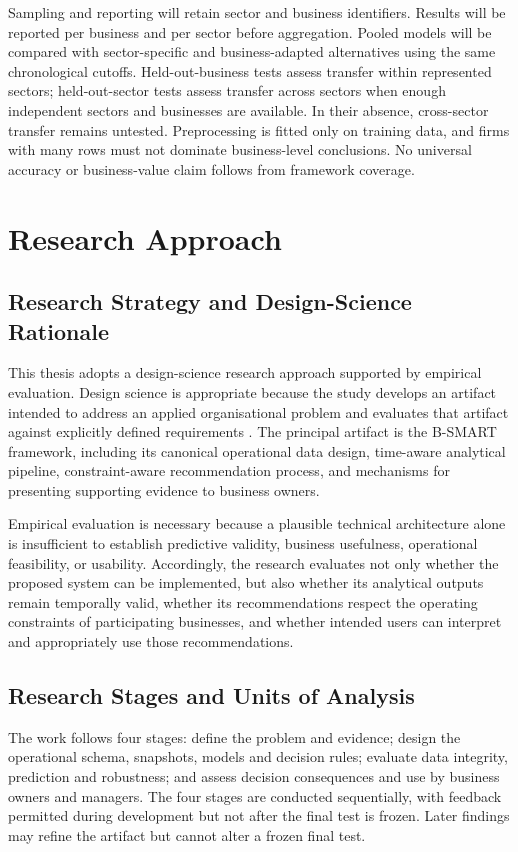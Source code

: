 \documentclass[a4paper,11pt,oneside]{book}
\theoremstyle{plain}
\theoremstyle{definition}
\theoremstyle{remark}
\newcommand{\system}{B-SMART}
\begin{document}
Sampling and reporting will retain sector and business identifiers. Results
will be reported per business and per sector before aggregation. Pooled models
will be compared with sector-specific and business-adapted alternatives using
the same chronological cutoffs. Held-out-business tests assess transfer within
represented sectors; held-out-sector tests assess transfer across sectors when
enough independent sectors and businesses are available. In their absence,
cross-sector transfer remains untested. Preprocessing is fitted only on training
data, and firms with many rows must not dominate business-level conclusions.
No universal accuracy or business-value claim follows from framework coverage.

\section{Research Approach}
\label{sec:research_approach}

\subsection{Research Strategy and Design-Science Rationale}

This thesis adopts a design-science research approach supported by empirical
evaluation. Design science is appropriate because the study develops an artifact
intended to address an applied organisational problem and evaluates that artifact
against explicitly defined requirements \cite{hevner2004design}. The principal
artifact is the \system{} framework, including its canonical operational data
design, time-aware analytical pipeline, constraint-aware recommendation process,
and mechanisms for presenting supporting evidence to business owners.

Empirical evaluation is necessary because a plausible technical architecture
alone is insufficient to establish predictive validity, business usefulness,
operational feasibility, or usability. Accordingly, the research evaluates not
only whether the proposed system can be implemented, but also whether its
analytical outputs remain temporally valid, whether its recommendations respect
the operating constraints of participating businesses, and whether intended
users can interpret and appropriately use those recommendations.


\subsection{Research Stages and Units of Analysis}
The work follows four stages: define the problem and evidence; design the
operational schema, snapshots, models and decision rules; evaluate data
integrity, prediction and robustness; and assess decision consequences and
use by business owners and managers. The four stages are conducted sequentially, with feedback permitted during development but not after the final test is frozen.
Later findings may refine the artifact but cannot alter a frozen final test.
\end{document}
